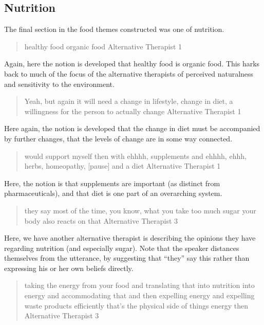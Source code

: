 \subsection{Nutrition}
\label{sec:nutrition}

The final section in the food themes constructed was one of nutrition. 

\begin{quotation}
  healthy food organic food
Alternative Therapist 1
\end{quotation}

Again, here the notion is developed that healthy food is organic food. This harks back to much of the focus of the alternative therapists of perceived naturalness and sensitivity to the environment. 

\begin{quotation}
  Yeah, but again it will need a change in lifestyle, change in diet, a willingness for the person to actually change 
Alternative Therapist 1
\end{quotation}

Here again, the notion is developed that the change in diet must be accompanied by further changes, that the levels of change are in some way connected. 

\begin{quotation}
  would support myself then with ehhhh, supplements and ehhhh, ehhh, herbs, homeopathy, [pause] and a diet
Alternative Therapist 1
\end{quotation}

Here, the notion is that supplements are important (as distinct from pharmaceuticals), and that diet is one part of an overarching system. 

\begin{quotation}
  
 they say most of the time, you know, what you take too much sugar your body also reacts on that 
Alternative Therapist 3
\end{quotation}

Here, we have another alternative therapist is describing the opinions they have regarding nutrition (and especially sugar). Note that the speaker distances themselves from the utterance, by suggesting that ``they'' say this rather than expressing his or her own beliefs directly. 

\begin{quotation}
  taking the energy from your food and translating that into nutrition into energy and accommodating that and then expelling energy and expelling waste products efficiently that's the physical side of things energy then
Alternative Therapist 3
\end{quotation}

